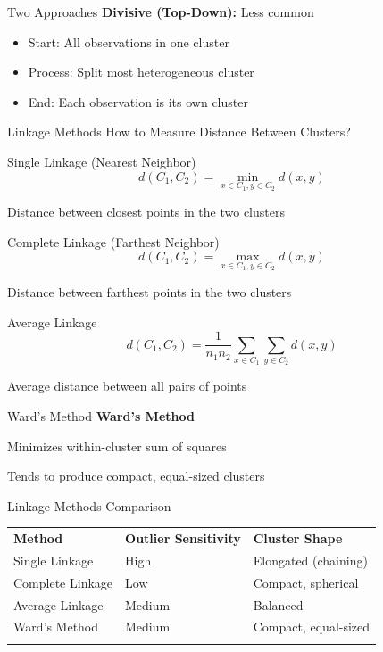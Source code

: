 \documentclass[aspectratio=169,ignorenonframetext]{beamer}
\begin{document}
\begin{frame}{Two Approaches}
\textbf{Divisive (Top-Down):} Less common

\begin{itemize}
\item
  Start: All observations in one cluster
\item
  Process: Split most heterogeneous cluster
\item
  End: Each observation is its own cluster
\end{itemize}
\end{frame}

\begin{frame}{Linkage Methods}
How to Measure Distance Between Clusters?
\end{frame}

\begin{frame}{Single Linkage (Nearest Neighbor)}
\[d\left( C_{1},C_{2} \right) = \min\limits_{x \in C_{1},y \in C_{2}}d(x,y)\]

Distance between closest points in the two clusters
\end{frame}

\begin{frame}{Complete Linkage (Farthest Neighbor)}
\[d\left( C_{1},C_{2} \right) = \max\limits_{x \in C_{1},y \in C_{2}}d(x,y)\]

Distance between farthest points in the two clusters
\end{frame}

\begin{frame}{Average Linkage}
\[d\left( C_{1},C_{2} \right) = \frac{1}{n_{1}n_{2}}\sum_{x \in C_{1}}\sum_{y \in C_{2}}d(x,y)\]

Average distance between all pairs of points
\end{frame}

\begin{frame}{Ward's Method}
\textbf{Ward's Method}

Minimizes within-cluster sum of squares

Tends to produce compact, equal-sized clusters
\end{frame}

\begin{frame}{Linkage Methods Comparison}
{\def\LTcaptype{none} %
\begin{longtable}[]{@{}
  >{\raggedright\arraybackslash}p{}
  >{\centering\arraybackslash}p{}
  >{\raggedright\arraybackslash}p{}@{}}
\toprule\noalign{}
\endhead
\textbf{Method} & \textbf{Outlier Sensitivity} & \textbf{Cluster
Shape} \\
Single Linkage & High & Elongated (chaining) \\
Complete Linkage & Low & Compact, spherical \\
Average Linkage & Medium & Balanced \\
Ward's Method & Medium & Compact, equal-sized \\
\bottomrule\noalign{}
\end{longtable}
}
\end{frame}
\end{document}
